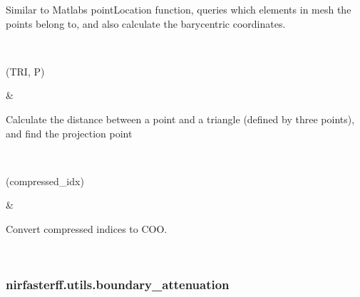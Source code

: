\documentclass[letterpaper,10pt,english]{sphinxmanual}
\begin{document}
\begin{savenotes}
\begin{longtable}{}
\begin{varwidth}[t]{}
\sphinxAtStartPar
Similar to Matlab\textquotesingle{}s pointLocation function, queries which elements in mesh the points belong to, and also calculate the barycentric coordinates.
\sphinxbeforeendvarwidth
\end{varwidth}%
\\
\sphinxhline\begin{varwidth}[t]{}
\sphinxAtStartPar
{\hyperref[\detokenize{_autosummary/nirfasterff.utils.pointTriangleDistance:nirfasterff.utils.pointTriangleDistance}]{}}(TRI, P)
\sphinxbeforeendvarwidth
\end{varwidth}%
&\begin{varwidth}[t]{}
\sphinxAtStartPar
Calculate the distance between a point and a triangle (defined by three points), and find the projection point
\sphinxbeforeendvarwidth
\end{varwidth}%
\\
\sphinxhline\begin{varwidth}[t]{}
\sphinxAtStartPar
{\hyperref[\detokenize{_autosummary/nirfasterff.utils.uncompress_coo:nirfasterff.utils.uncompress_coo}]{}}(compressed\_idx)
\sphinxbeforeendvarwidth
\end{varwidth}%
&\begin{varwidth}[t]{}
\sphinxAtStartPar
Convert compressed indices to COO.
\sphinxbeforeendvarwidth
\end{varwidth}%
\\
\sphinxbottomrule
\end{longtable}
\sphinxtableafterendhook
\sphinxatlongtableend
\end{savenotes}

\sphinxstepscope


\subsubsection{nirfasterff.utils.boundary\_attenuation}
\label{\detokenize{_autosummary/nirfasterff.utils.boundary_attenuation:nirfasterff-utils-boundary-attenuation}}\label{\detokenize{_autosummary/nirfasterff.utils.boundary_attenuation::doc}}
\end{document}
